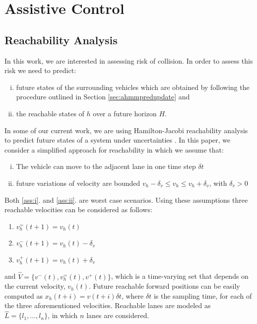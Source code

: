 \documentclass[letterpaper, 10 pt, conference]{ieeeconf}  %
\newcommand\NB[1]{$\spadesuit$\footnote{NB: #1}}
\begin{document}
\section{Assistive Control} \label{sec:adapt}


\subsection{Reachability Analysis}

In this work, we are interested in assessing risk of collision. In order to assess this risk we need to predict:
\begin{enumerate}[i.]
\item future states of the surrounding vehicles which are obtained by following the procedure outlined in Section \ref{sec:ahmmpredupdate} and
\item the reachable states of $h$ over a future horizon $H$.
\end{enumerate}
In some of our current work, we are using Hamilton-Jacobi reachability analysis to predict future states of a system under uncertainties \cite{esen}. In this paper, we consider a simplified approach for reachability in which we assume that:
\begin{enumerate}[i.]
\item The vehicle can move to the adjacent lane in one time step $\delta t$ \label{ass:i}
\item future variations of velocity are bounded $v_h-\delta_v \leq v_h\leq v_h+\delta_v$, with $\delta_v>0$ \label{ass:ii}
\end{enumerate}
Both \ref{ass:i}. and \ref{ass:ii}. are worst case scenarios. %
Using these assumptions three reachable velocities can be considered as follows:
\begin{enumerate} %
    \item $v_h^=(t+1)=v_h(t)$
    \item $v_h^-(t+1)=v_h(t)-\delta_v$
    \item $v_h^+(t+1)=v_h(t)+\delta_v$
\end{enumerate} 
and $\hat{V} = \{v^-(t),v_h^=(t),v^+(t)\}$, which is a time-varying set that depends on the current velocity, $v_h(t)$. Future reachable forward positions can be easily computed as $x_h(t+i)=v(t+i)\delta t$, where $\delta t$ is the sampling time, for each of the three aforementioned velocities. Reachable lanes are modeled as $\hat{L} = \{l_1,\ldots,l_n\}$, in which $n$ lanes are considered. 
\end{document}
